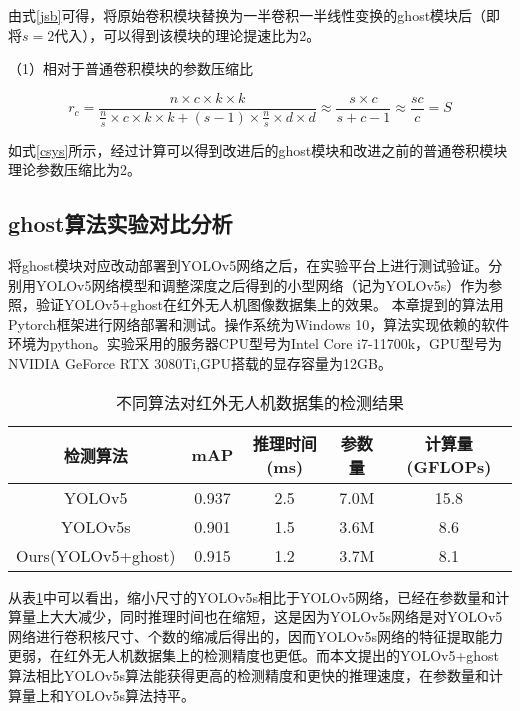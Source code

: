 由式\ref{jsb}可得，将原始卷积模块替换为一半卷积一半线性变换的ghost模块后（即将$s=2$代入），可以得到该模块的理论提速比为2。

（1）相对于普通卷积模块的参数压缩比

\begin{equation}
    r_{c}=\frac{n \times c \times k \times k}{\frac{n}{s} \times c \times k \times k+(s-1) \times \frac{n}{s} \times d \times d} \approx \frac{s \times c}{s+c-1} \approx \frac{s c}{c}=S
    \label{csys}
\end{equation}

如式\ref{csys}所示，经过计算可以得到改进后的ghost模块和改进之前的普通卷积模块理论参数压缩比为2。

\subsection{ghost算法实验对比分析}
将ghost模块对应改动部署到YOLOv5网络之后，在实验平台上进行测试验证。分别用YOLOv5网络模型和调整深度之后得到的小型网络（记为YOLOv5s）作为参照，验证YOLOv5+ghost在红外无人机图像数据集上的效果。
本章提到的算法用Pytorch框架进行网络部署和测试。操作系统为Windows 10，算法实现依赖的软件环境为python。实验采用的服务器CPU型号为Intel Core i7-11700k，GPU型号为NVIDIA GeForce RTX 3080Ti,GPU搭载的显存容量为12GB。

\begin{table}[htbp]
    \caption{不同算法对红外无人机数据集的检测结果}
    \vspace{0.5em}\centering\wuhao
    \begin{tabular}{ccccc}
    \toprule
    检测算法 & mAP & 推理时间(ms) & 参数量 & 计算量(GFLOPs)\\
    \midrule
    YOLOv5 & 0.937 & 2.5 & 7.0M & 15.8\\
    YOLOv5s & 0.901 & 1.5 & 3.6M & 8.6\\
    Ours(YOLOv5+ghost)& 0.915 & 1.2 & 3.7M & 8.1\\
    \bottomrule
    \end{tabular}
    \label{t22}
\end{table}

从表\ref{t22}中可以看出，缩小尺寸的YOLOv5s相比于YOLOv5网络，已经在参数量和计算量上大大减少，同时推理时间也在缩短，这是因为YOLOv5s网络是对YOLOv5网络进行卷积核尺寸、个数的缩减后得出的，因而YOLOv5s网络的特征提取能力更弱，在红外无人机数据集上的检测精度也更低。而本文提出的YOLOv5+ghost算法相比YOLOv5s算法能获得更高的检测精度和更快的推理速度，在参数量和计算量上和YOLOv5s算法持平。

